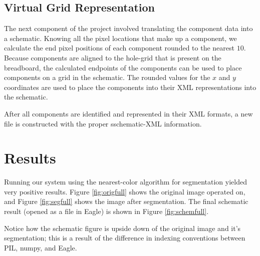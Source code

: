 \documentclass[10pt,twocolumn,letterpaper]{article}
\begin{document}
\subsection{Virtual Grid Representation}

The next component of the project involved translating the component data into
a schematic. Knowing all the pixel locations that make up a component, we
calculate the end pixel positions of each component rounded to the nearest
$10$. Because components are aligned to the hole-grid that is present on the
breadboard, the calculated endpoints of the components can be used to place
components on a grid in the schematic. The rounded values for the $x$ and $y$
coordinates are used to place the components into their XML representations
into the schematic. 

After all components are identified and represented in their XML formats, a new
file is constructed with the proper sschematic-XML information.    

\section{Results}

Running our system using the nearest-color algorithm for segmentation yielded
very positive results. Figure \ref{fig:origfull} shows the original image
operated on, and Figure \ref{fig:segfull} shows the image after
segmentation. The final schematic result (opened as a file in Eagle) is shown
in Figure \ref{fig:schemfull}. 

Notice how the schematic figure is upside down of the original image and it's
segmentation; this is a result of the difference in indexing conventions
between PIL, numpy, and Eagle.
\end{document}
